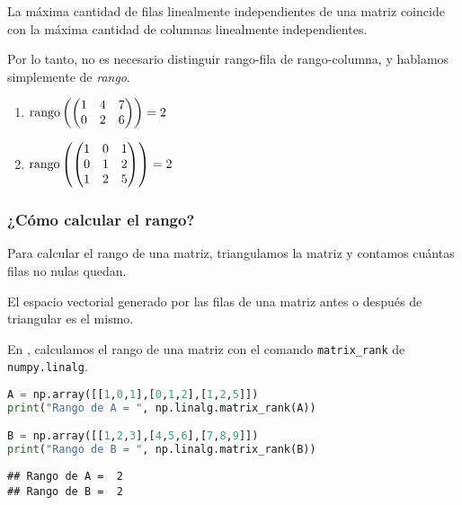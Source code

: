 \begin{proposicion} La máxima cantidad de filas linealmente independientes de una matriz coincide con la máxima cantidad de columnas linealmente independientes.
\end{proposicion}

Por lo tanto, no es necesario distinguir rango-fila de rango-columna, y hablamos simplemente de \emph{rango}.

\begin{ejemplo}\leavevmode
\begin{enumerate}
\item $\operatorname{rango}\left(\begin{pmatrix}1&4&7\\0&2&6\end{pmatrix}\right) = 2$
\item $\operatorname{rango}\left(\begin{pmatrix}1&0&1 \\ 0&1&2 \\ 1 & 2 & 5\end{pmatrix}\right) = 2$
\end{enumerate}
\end{ejemplo}

\subsubsection{¿Cómo calcular el rango?}

Para calcular el rango de una matriz, triangulamos la matriz y contamos cuántas filas no nulas quedan.

\begin{proposicion}
El espacio vectorial generado por las filas de una matriz antes o después de triangular es el mismo.
\end{proposicion}

En \python, calculamos el rango de una matriz con el comando \texttt{matrix\_rank} de \texttt{numpy.linalg}.

\begin{Shaded}
\begin{lstlisting}[language=Python]
A = np.array([[1,0,1],[0,1,2],[1,2,5]])
print("Rango de A = ", np.linalg.matrix_rank(A))

B = np.array([[1,2,3],[4,5,6],[7,8,9]])
print("Rango de B = ", np.linalg.matrix_rank(B))
\end{lstlisting}
\end{Shaded}

\begin{verbatim}
## Rango de A =  2
## Rango de B =  2
\end{verbatim}

